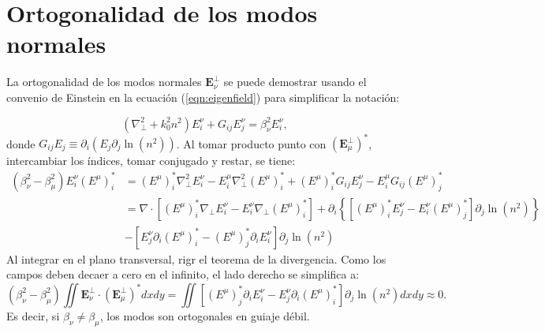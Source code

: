 \chapter{Ortogonalidad de los modos normales \label{sec:orto}}

La ortogonalidad de los modos normales $\textbf{E}_\nu^\perp$ se puede demostrar usando el convenio de Einstein en la ecuación (\ref{eqn:eigenfield}) para simplificar la notación:

\begin{equation}
	\left(\nabla_\perp^2 + k_0^2n^2\right) E^\nu_i + G_{ij} E^\nu_j = \beta_\nu^2 E^\nu_i,
\end{equation}
donde $G_{ij}E_j \equiv \partial_i \left(E_j  \partial_j\ln(n^2) \right)$. Al tomar producto punto con $\left(\textbf{E}_\mu^\perp\right)^*$, intercambiar los índices, tomar conjugado y restar, se tiene:
\begin{align*}
	(\beta_\nu^2-\beta_\mu^2)E^\nu_i \left(E^\mu\right)^*_i &=  \left(E^\mu\right)^*_i \nabla_\perp^2 E^\nu_i - E^\mu_i \nabla_\perp^2 \left(E^\mu\right)^*_i  + \left(E^\mu\right)^*_i G_{ij} E^\nu_j - E^\mu_i G_{ij} \left(E^\mu\right)^*_j
	\\
	&= \nabla \cdot \left[ \left(E^\mu\right)^*_i \nabla_\perp E^\nu_i - E^\nu_i \nabla_\perp \left(E^\mu\right)^*_i \right] + \partial_i \left\{\left[ \left(E^\mu\right)^*_i  E^\nu_j  - E^\nu_i \left(E^\mu\right)^*_j \right] \partial_j   \ln(n^2) \right\}
	\\
	&-\left[ E^\nu_j \partial_i \left(E^\mu\right)^*_i -   \left(E^\mu\right)^*_j \partial_i E^\nu_i\right] \partial_j\ln(n^2)
\end{align*}
Al integrar en el plano transversal, rigr el teorema de la divergencia. Como los campos deben decaer a cero en el infinito, el lado derecho se simplifica a:
\begin{equation}
	(\beta_\nu^2-\beta_\mu^2)\iint \textbf{E}^\perp_\nu \cdot \left(\textbf{E}^\perp_\mu\right)^* dx dy = \iint  \left[ \left(E^\mu\right)^*_j \partial_i E^\nu_i - E^\nu_j \partial_i \left(E^\mu\right)^*_i\right] \partial_j\ln(n^2) dxdy \approx
	0.
\end{equation}
Es decir, si $\beta_\nu \neq \beta_\mu$, los modos son ortogonales en guiaje débil.